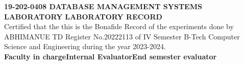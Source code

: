 \documentclass{article}
\begin{document}
{\large \vspace{1cm} \textbf{19-202-0408 DATABASE MANAGEMENT SYSTEMS LABORATORY} \singlespacing \textbf{LABORATORY RECORD \vspace{1cm}}
}
{\\ \large Certified that the this is the Bonafide Record of the experiments done by ABHIMANUE TD Register No.20222113 of IV Semester B-Tech Computer Science and Engineering during the year 2023-2024.}
\\
\vspace{3cm} \textbf{ \small{Faculty in charge\hspace{1cm}Internal Evaluator\hspace{1cm}End semester evaluator}}
\newpage
\fancyhead{}
\setcounter{tocdepth}{1}

\newpage
\begin{verbatim}
    
\end{verbatim}
\end{document}
